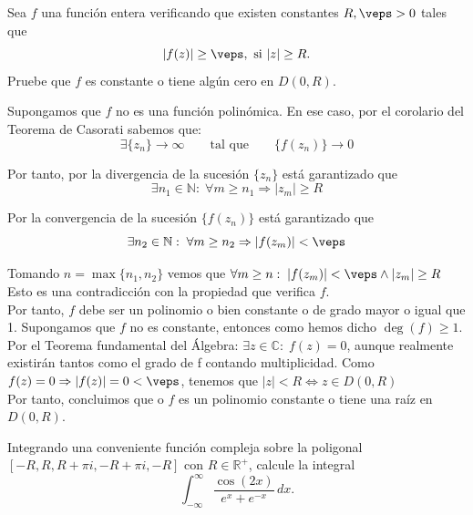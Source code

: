 \documentclass[12pt]{article}
\begin{document}
    \begin{ejercicio}[2 puntos]
        Sea $f$ una función entera verificando que existen constantes $R, \veps > 0$ tales que
        \[ |f(z)| \ge \veps, \text{ si } |z| \ge R. \]
        Pruebe que $f$ es constante o tiene algún cero en $D(0, R)$.
        
        \bigskip

        Supongamos que $f$ no es una función polinómica. En ese caso, por el corolario del Teorema de Casorati sabemos que:
        \[ \exists \{z_n\} \rightarrow \infty\qquad \text{tal que} \qquad \{f(z_n)\} \rightarrow 0 \]

        Por tanto, por la divergencia de la sucesión $\{z_n\}$ está garantizado que 
        \[\exists n_1 \in \mathbb{N} :\; \forall m \geq n_1 \Rightarrow |z_m| \geq R\]

        Por la convergencia de la sucesión $\{f(z_n)\}$ está garantizado que 
        \[\exists n_2 \in \mathbb{N} : \; \forall m \geq n_2 \Rightarrow |f(z_m)| < \veps\]

        Tomando $n=\max\{n_1,n_2\}$ vemos que $\forall m \geq n : \; |f(z_m)| < \veps \wedge |z_m| \geq R$\\
        
        Esto es una contradicción con la propiedad que verifica $f$.\\

        Por tanto, $f$ debe ser un polinomio o bien constante o de grado mayor o igual que 1. Supongamos que $f$ no es constante, entonces como hemos dicho $\deg(f) \geq 1$.\\

        Por el Teorema fundamental del Álgebra: $\exists z\in \mathbb{C} : \; f(z) = 0$, aunque realmente existirán tantos como el grado de f contando multiplicidad. Como $f(z)=0 \Rightarrow |f(z)| = 0 < \veps$, tenemos que $|z| < R \iff z\in D(0,R)$\\

        Por tanto, concluimos que o $f$ es un polinomio constante o tiene una raíz en $D(0,R)$.
    \end{ejercicio}

    \begin{ejercicio}[2.5 puntos]
        Integrando una conveniente función compleja sobre la poligonal $[-R, R, R + \pi i, -R + \pi i, -R]$ con $R \in \mathbb{R}^+$, calcule la integral
        \[ \int_{-\infty}^{\infty} \frac{\cos(2x)}{e^x + e^{-x}} \, dx. \]
        
    \end{ejercicio}
\end{document}
